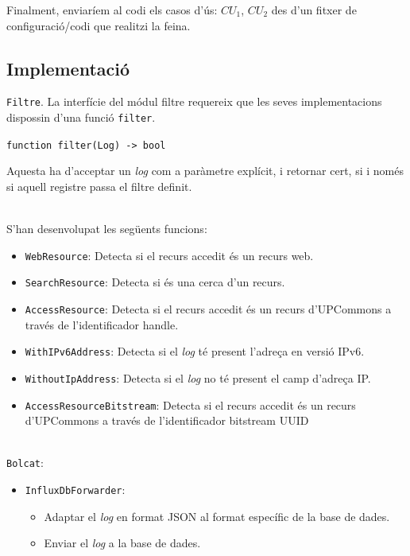 \noindent
Finalment, enviaríem al codi els casos d’ús: \(CU_1\), \(CU_2\) des d'un fitxer de configuració/codi que realitzi la feina.

\clearpage

\subsection{Implementació}\label{subsec:log-implementation}

\noindent
\texttt{Filtre}.
La interfície del módul filtre requereix que les seves implementacions dispossin d'una funció \texttt{filter}.
\begin{center}
    \texttt{function filter(Log) -> bool}
\end{center}
Aquesta ha d'acceptar un \textit{log} com a paràmetre explícit, i retornar cert, si i només si aquell registre passa el filtre definit.

\noindent \\
S'han desenvolupat les següents funcions:

\begin{itemize}
    \item \texttt{WebResource}: Detecta si el recurs accedit és un recurs web.
    \item \texttt{SearchResource}: Detecta si és una cerca d’un recurs.
    \item \texttt{AccessResource}: Detecta si el recurs accedit és un recurs d’\gls{UPCommons} a través de l'identificador \gls{handle}.
    \item \texttt{WithIPv6Address}: Detecta si el \textit{log} té present l’adreça en versió IPv6.
    \item \texttt{WithoutIpAddress}: Detecta si el \textit{log} no té present el camp d'adreça \gls{IP}.
    \item \texttt{AccessResourceBitstream}: Detecta si el recurs accedit és un recurs d’\gls{UPCommons} a través de l'identificador \gls{bitstream} \gls{UUID}
\end{itemize}

\noindent \\
\texttt{Bolcat}:
\begin{itemize}
    \item \texttt{InfluxDbForwarder}:
    \begin{itemize}
        \item Adaptar el \textit{log} en format JSON al format específic de la base de dades.
        \item Enviar el \textit{log} a la base de dades.
    \end{itemize}
\end{itemize}

